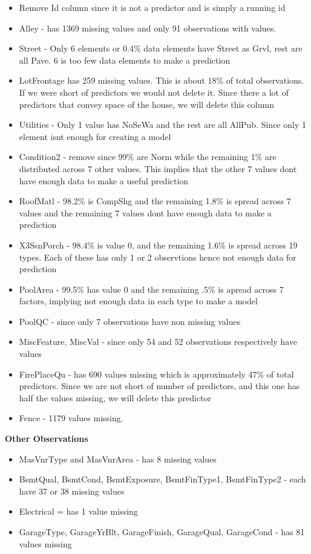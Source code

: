 \documentclass[
]{article}
\providecommand{\tightlist}{%
  \setlength{\itemsep}{0pt}\setlength{\parskip}{0pt}}
\begin{document}
\begin{itemize}
\tightlist
\item
  Remove Id column since it is not a predictor and is simply a running id
\item
  Alley - has 1369 missing values and only 91 observations with values.
\item
  Street - Only 6 elements or 0.4\% data elements have Street as Grvl, rest are all Pave. 6 is too few data elements to make a prediction
\item
  LotFrontage has 259 missing values. This is about 18\% of total observations. If we were short of predictors we would not delete it. Since there a lot of predictors that convey space of the house, we will delete this column
\item
  Utilities - Only 1 value has NoSeWa and the rest are all AllPub. Since only 1 element isnt enough for creating a model
\item
  Condition2 - remove since 99\% are Norm while the remaining 1\% are distributed across 7 other values. This implies that the other 7 values dont have enough data to make a useful prediction
\item
  RoofMatl - 98.2\% is CompShg and the remaining 1.8\% is spread across 7 values and the remaining 7 values dont have enough data to make a prediction
\item
  X3SsnPorch - 98.4\% is value 0, and the remaining 1.6\% is spread across 19 types. Each of these has only 1 or 2 observtions hence not enough data for prediction
\item
  PoolArea - 99.5\% has value 0 and the remaining .5\% is apread across 7 factors, implying not enough data in each type to make a model
\item
  PoolQC - since only 7 observations have non missing values
\item
  MiscFeature, MiscVal - since only 54 and 52 observations respectively have values
\item
  FirePlaceQu - has 690 values missing which is approximately 47\% of total predictors. Since we are not short of number of predictors, and this one has half the values missing, we will delete this predictor
\item
  Fence - 1179 values missing.
\end{itemize}

\textbf{Other Observations}

\begin{itemize}
\tightlist
\item
  MasVnrType and MasVnrArea - has 8 missing values
\item
  BsmtQual, BsmtCond, BsmtExposure, BsmtFinType1, BsmtFinType2 - each have 37 or 38 missing values
\item
  Electrical = has 1 value missing
\item
  GarageType, GarageYrBlt, GarageFinish, GarageQual, GarageCond - has 81 values missing
\end{itemize}
\end{document}
